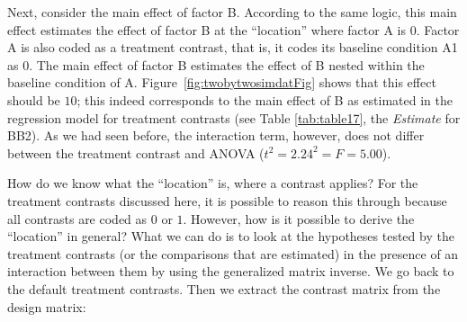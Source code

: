 \documentclass[
  12pt,
]{krantz}
\newenvironment{Shaded}{\begin{snugshade}}{\end{snugshade}}
\newcommand{\DecValTok}[1]{\textcolor[rgb]{0.00,0.00,0.81}{#1}}
\newcommand{\FunctionTok}[1]{\textcolor[rgb]{0.00,0.00,0.00}{#1}}
\newcommand{\NormalTok}[1]{#1}
\newcommand{\OtherTok}[1]{\textcolor[rgb]{0.56,0.35,0.01}{#1}}
\newcommand{\SpecialCharTok}[1]{\textcolor[rgb]{0.00,0.00,0.00}{#1}}
\newcommand{\StringTok}[1]{\textcolor[rgb]{0.31,0.60,0.02}{#1}}
\theoremstyle{definition}
\theoremstyle{definition}
\theoremstyle{definition}
\theoremstyle{definition}
\theoremstyle{remark}
\begin{document}
Next, consider the main effect of factor B. According to the same logic, this main effect estimates the effect of factor B at the ``location'' where factor A is \(0\). Factor A is also coded as a treatment contrast, that is, it codes its baseline condition A1 as \(0\). The main effect of factor B estimates the effect of B nested within the baseline condition of A. Figure~\ref{fig:twobytwosimdatFig} shows that this effect should be \(10\); this indeed corresponds to the main effect of B as estimated in the regression model for treatment contrasts (see Table \ref{tab:table17}, the \emph{Estimate} for BB2). As we had seen before, the interaction term, however, does not differ between the treatment contrast and ANOVA (\(t^2 = 2.24^2 = F = 5.00\)).

How do we know what the ``location'' is, where a contrast applies? For the treatment contrasts discussed here, it is possible to reason this through because all contrasts are coded as \(0\) or \(1\). However, how is it possible to derive the ``location'' in general? What we can do is to look at the hypotheses tested by the treatment contrasts (or the comparisons that are estimated) in the presence of an interaction between them by using the generalized matrix inverse. We go back to the default treatment contrasts. Then we extract the contrast matrix from the design matrix:

\begin{Shaded}
\end{Shaded}
\end{document}
